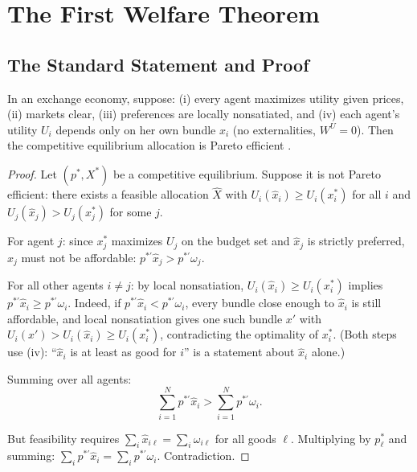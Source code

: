 \documentclass[../structural_economics_book.tex]{subfiles}
\begin{document}
\section{The First Welfare Theorem}
\label{ch02:sec:FWT}

\subsection{The Standard Statement and Proof}

\begin{theorem}\label{ch02:thm:FWT}
In an exchange economy, suppose: (i) every agent maximizes utility given prices, (ii) markets clear, (iii) preferences are locally nonsatiated, and (iv) each agent's utility $U_i$ depends only on her own bundle $x_i$ (no externalities, $W^U = 0$). Then the competitive equilibrium allocation is Pareto efficient \citep[Prop.~16.C.1]{mascolell1995microeconomic}.
\end{theorem}

\begin{proof}
Let $(p^*, X^*)$ be a competitive equilibrium. Suppose it is not Pareto efficient: there exists a feasible allocation $\hat{X}$ with $U_i(\hat{x}_i) \geq U_i(x_i^*)$ for all $i$ and $U_j(\hat{x}_j) > U_j(x_j^*)$ for some $j$.

For agent $j$: since $x_j^*$ maximizes $U_j$ on the budget set and $\hat{x}_j$ is strictly preferred, $\hat{x}_j$ must not be affordable: $p^{*\prime}\hat{x}_j > p^{*\prime}\omega_j$.

For all other agents $i \neq j$: by local nonsatiation, $U_i(\hat{x}_i) \geq U_i(x_i^*)$ implies $p^{*\prime}\hat{x}_i \geq p^{*\prime}\omega_i$. Indeed, if $p^{*\prime}\hat{x}_i < p^{*\prime}\omega_i$, every bundle close enough to $\hat{x}_i$ is still affordable, and local nonsatiation gives one such bundle $x'$ with $U_i(x') > U_i(\hat{x}_i) \geq U_i(x_i^*)$, contradicting the optimality of $x_i^*$. (Both steps use (iv): ``$\hat x_i$ is at least as good for $i$'' is a statement about $\hat x_i$ alone.)

Summing over all agents:
\begin{equation}
\sum_{i=1}^N p^{*\prime}\hat{x}_i > \sum_{i=1}^N p^{*\prime}\omega_i.
\end{equation}

But feasibility requires $\sum_i \hat{x}_{i\ell} = \sum_i \omega_{i\ell}$ for all goods $\ell$. Multiplying by $p^*_\ell$ and summing: $\sum_i p^{*\prime}\hat{x}_i = \sum_i p^{*\prime}\omega_i$. Contradiction.
\end{proof}
\end{document}
